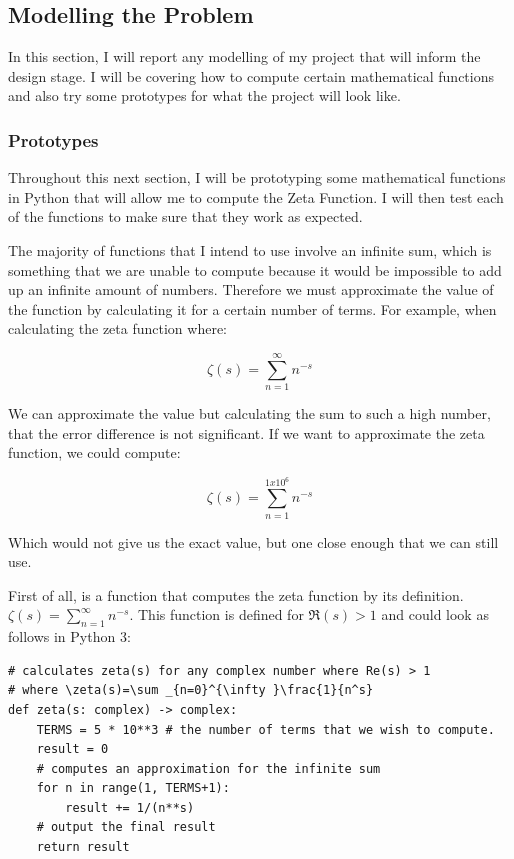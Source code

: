 \documentclass{article}
\begin{document}
\clearpage
\subsection{Modelling the Problem}
In this section, I will report any modelling of my project that will inform the design stage. I will be covering how to compute certain mathematical functions and also try some prototypes for what the project will look like.

\subsubsection{Prototypes}

Throughout this next section, I will be prototyping some mathematical functions in Python that will allow me to compute the Zeta Function. I will then test each of the functions to make sure that they work as expected.

The majority of functions that I intend to use involve an infinite sum, which is something that we are unable to compute because it would be impossible to add up an infinite amount of numbers. Therefore we must approximate the value of the function by calculating it for a certain number of terms. For example, when calculating the zeta function where:

$$\zeta(s) = \sum_{n=1}^{\infty} n^{-s}$$

We can approximate the value but calculating the sum to such a high number, that the error difference is not significant. If we want to approximate the zeta function, we could compute:

$$\zeta(s) = \sum_{n=1}^{1x10^6} n^{-s}$$

Which would not give us the exact value, but one close enough that we can still use.

First of all, is a function that computes the zeta function by its definition. $\zeta(s) = \sum_{n=1}^{\infty} n^{-s}$. This function is defined for $\Re(s) > 1$ and could look as follows in Python 3:

\begin{lstlisting}
# calculates zeta(s) for any complex number where Re(s) > 1
# where \zeta(s)=\sum _{n=0}^{\infty }\frac{1}{n^s}
def zeta(s: complex) -> complex:
    TERMS = 5 * 10**3 # the number of terms that we wish to compute.
    result = 0
    # computes an approximation for the infinite sum
    for n in range(1, TERMS+1):
        result += 1/(n**s)
    # output the final result
    return result
\end{lstlisting}
\end{document}
